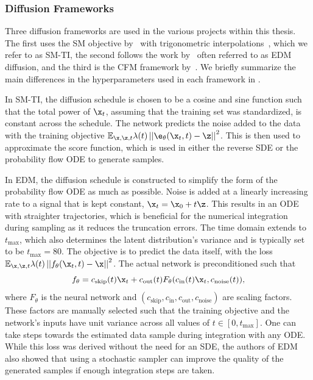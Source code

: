 \subsubsection{Diffusion Frameworks}

Three diffusion frameworks are used in the various projects within this thesis.
The first uses the SM objective by~\textcite{GenerativeModelingEstimating} with trigonometric interpolations~\cite{StochasticInterpolants, ImprovedDenoisingDiffusion}, which we refer to as SM-TI, the second follows the work by~\textcite{ElucidatingDesignSpace} often referred to as EDM diffusion, and the third is the CFM framework by~\textcite{FlowMatchingGenerative, FlowStraightFast, BuildingNormalizingFlows}.
We briefly summarize the main differences in the hyperparameters used in each framework in .

In SM-TI, the diffusion schedule is chosen to be a cosine and sine function such that the total power of $\x_t$, assuming that the training set was standardized, is constant across the schedule.
The network predicts the noise added to the data with the training objective
$\mathbb{E}_{\x, \z, t} \lambda(t) \left|\left| \e_\theta(\x_t, t) - \z\right|\right|^2$.
This is then used to approximate the score function, which is used in either the reverse SDE or the probability flow ODE to generate samples.

In EDM, the diffusion schedule is constructed to simplify the form of the probability flow ODE as much as possible.
Noise is added at a linearly increasing rate to a signal that is kept constant, $\x_t = \x_0 + t\z$.
This results in an ODE with straighter trajectories, which is beneficial for the numerical integration during sampling as it reduces the truncation errors.
The time domain extends to $t_\text{max}$, which also determines the latent distribution's variance and is typically set to be $t_\text{max} = 80$.
The objective is to predict the data itself, with the loss $\mathbb{E}_{\x, \z, t} \lambda(t) \left|\left| f_\theta(\x_t, t) - \x\right|\right|^2$.
The actual network is preconditioned such that
\begin{equation}
    f_\theta = c_\text{skip}(t) \x_t + c_\text{out}(t)F_\theta(c_\text{in}(t)\x_t, c_\text{noise}(t)),
\end{equation}
where $F_\theta$ is the neural network and $(c_\text{skip}, c_\text{in}, c_\text{out}, c_\text{noise})$ are scaling factors.
These factors are manually selected such that the training objective and the network's inputs have unit variance across all values of $t \in [0, t_\text{max}]$.
One can take steps towards the estimated data sample during integration with any ODE.
While this loss was derived without the need for an SDE, the authors of EDM also showed that using a stochastic sampler can improve the quality of the generated samples if enough integration steps are taken.

